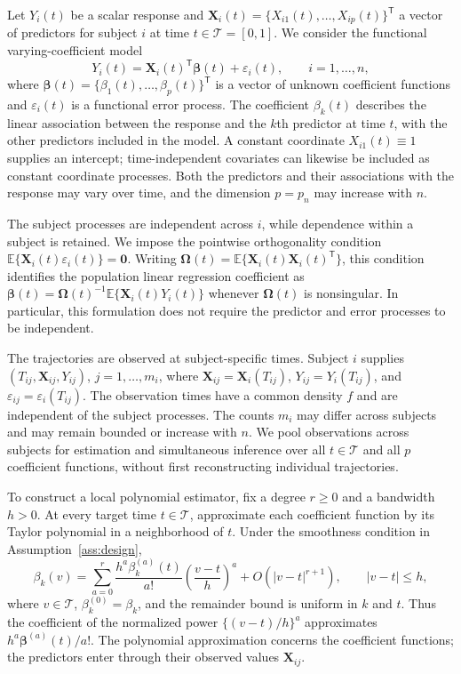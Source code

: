 \documentclass[12pt]{article}
\newcommand{\bX}{{\mathbf X}}
\newcommand{\bbeta}  {\boldsymbol{\beta}}
\newcommand{\bOmega} {\boldsymbol{\Omega}}
\newcommand{\expect}{\mathbb{E}}
\newcommand{\trans}{{\scriptscriptstyle\mathsf{T}}}
\numberwithin{equation}{section}
\begin{document}
Let $Y_i(t)$ be a scalar response and
$\bX_i(t)=\{X_{i1}(t),\ldots,X_{ip}(t)\}^\trans$ a vector of predictors
for subject $i$ at time $t\in\mathcal T=[0,1]$.
We consider the functional varying-coefficient model
\begin{equation}
Y_i(t)=\bX_i(t)^\trans\bbeta(t)+\varepsilon_i(t),
\qquad i=1,\ldots,n,
\label{eq:model-VCM-pop}
\end{equation}
where $\bbeta(t)=\{\beta_1(t),\ldots,\beta_p(t)\}^\trans$ is a vector of
unknown coefficient functions and $\varepsilon_i(t)$ is a functional
error process. The coefficient $\beta_k(t)$ describes the linear
association between the response and the $k$th predictor at time $t$,
with the other predictors included in the model. A constant coordinate
$X_{i1}(t)\equiv1$ supplies an intercept; time-independent covariates can
likewise be included as constant coordinate processes. Both the predictors
and their associations with the response may vary over time, and the
dimension $p=p_n$ may increase with $n$.

The subject processes are independent across $i$, while dependence within
a subject is retained. We impose the pointwise orthogonality condition
$\expect\{\bX_i(t)\varepsilon_i(t)\}=\mathbf0$.
Writing $\bOmega(t)=\expect\{\bX_i(t)\bX_i(t)^\trans\}$, this condition
identifies the population linear regression coefficient as
$\bbeta(t)=\bOmega(t)^{-1}\expect\{\bX_i(t)Y_i(t)\}$
whenever $\bOmega(t)$ is nonsingular. In particular, this formulation
does not require the predictor and error processes to be independent.

The trajectories are observed at subject-specific times. Subject $i$
supplies $(T_{ij},\bX_{ij},Y_{ij})$, $j=1,\ldots,m_i$, where
$\bX_{ij}=\bX_i(T_{ij})$, $Y_{ij}=Y_i(T_{ij})$, and
$\varepsilon_{ij}=\varepsilon_i(T_{ij})$.
The observation times have a common density $f$ and are independent of
the subject processes. The counts $m_i$ may differ across subjects and
may remain bounded or increase with $n$. We pool observations across
subjects for estimation and simultaneous inference over all
$t\in\mathcal T$ and all $p$ coefficient functions, without first
reconstructing individual trajectories.

To construct a local polynomial estimator, fix a degree $r\ge0$ and a
bandwidth $h>0$. At every target time $t\in\mathcal T$, approximate each
coefficient function by its Taylor polynomial in
a neighborhood of $t$. Under the smoothness condition in
Assumption~\ref{ass:design},
\[
\beta_k(v)=\sum_{a=0}^r\frac{h^a\beta_k^{(a)}(t)}{a!}
\left(\frac{v-t}{h}\right)^a+O(|v-t|^{r+1}),
\qquad |v-t|\le h,
\]
where $v\in\mathcal T$, $\beta_k^{(0)}=\beta_k$, and the remainder
bound is uniform in $k$ and $t$.
Thus the coefficient of the normalized power $\{(v-t)/h\}^a$
approximates $h^a\bbeta^{(a)}(t)/a!$.
The polynomial approximation concerns the coefficient functions; the
predictors enter through their observed values $\bX_{ij}$.
\end{document}
